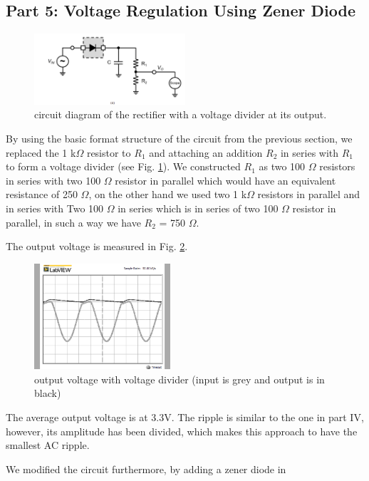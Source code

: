 \documentclass[letterpaper, 10 pt, conference]{ieeeconf}  %
\begin{document}
\subsection{Part 5: Voltage Regulation Using Zener Diode}
\begin{figure}[ht]
  \centering
  \includegraphics[width=0.5\textwidth]{images/5_1.png}
  \caption{circuit diagram of the rectifier with a voltage divider at its output.}
  \label{fig:5.1}
\end{figure}
By using the basic format structure of the circuit from the previous section,
we replaced the 1 k$\Omega$ resistor to $R_{1}$ and attaching an addition
$R_{2}$ in series with $R_{1}$ to form a voltage divider (see Fig. \ref{fig:5.1}).
We constructed $R_{1}$ as two 100 $\Omega$ resistors in series with two 100
$\Omega$ resistor in parallel which would have an equivalent resistance of
250 $\Omega$, on the other hand we used two 1 k$\Omega$ resistors in parallel
and in series with Two 100 $\Omega$ in series which is in series of two 100
$\Omega$ resistor in parallel, in such a way we have $R_{2}$ = 750 $\Omega$.
\par The output voltage is measured in Fig. \ref{fig:5.2}.
\begin{figure}[ht]
  \centering
  \includegraphics[width=0.45\textwidth]{images/5_2.png}
  \caption{output voltage with voltage divider (input is grey and output is in black)}
  \label{fig:5.2}
\end{figure}
\par The average output voltage is at 3.3V.
The ripple is similar to the one in part IV, however, its amplitude has been divided,
which makes this approach to have the smallest AC ripple.
\newpage
\par We modified the circuit furthermore, by adding a zener diode in
\end{document}
